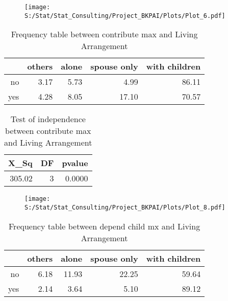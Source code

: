 \documentclass[11pt]{article}
\begin{document}
\begin{center}
\begin{figure}[H]
\texttt{[image: S:/Stat/Stat\_Consulting/Project\_BKPAI/Plots/Plot\_6.pdf]}

\end{figure}
\end{center}
\begin{table}[H]
\centering
\begin{tabular}{rrrrr}
  \hline
 & others & alone & spouse only & with children \\ 
  \hline
no & 3.17 & 5.73 & 4.99 & 86.11 \\ 
  yes & 4.28 & 8.05 & 17.10 & 70.57 \\ 
   \hline
\end{tabular}
\caption{Frequency table between contribute max and Living Arrangement} 
\end{table}
\begin{table}[H]
\centering
\begin{tabular}{rrr}
  \hline
X\_Sq & DF & pvalue \\ 
  \hline
305.02 & 3 & 0.0000 \\ 
   \hline
\end{tabular}
\caption{Test of independence between contribute max and Living Arrangement} 
\end{table}
\begin{center}
\begin{figure}[H]
\texttt{[image: S:/Stat/Stat\_Consulting/Project\_BKPAI/Plots/Plot\_8.pdf]}

\end{figure}
\end{center}
\begin{table}[H]
\centering
\begin{tabular}{rrrrr}
  \hline
 & others & alone & spouse only & with children \\ 
  \hline
no & 6.18 & 11.93 & 22.25 & 59.64 \\ 
  yes & 2.14 & 3.64 & 5.10 & 89.12 \\ 
   \hline
\end{tabular}
\caption{Frequency table between depend child mx and Living Arrangement} 
\end{table}
\end{document}
